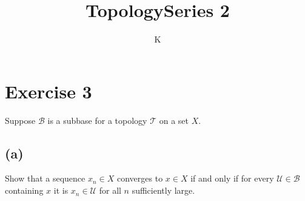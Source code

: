 \documentclass[a4paper]{article}
\title{Topology}
\author{K}
\title{Series 2}
\theoremstyle{definition}
\begin{document}
\maketitle

\section*{Exercise 3}
Suppose \(\mathcal{B}\) is a subbase for a topology \(\mathcal{T}\) on a set \(X\).

\subsection*{(a)}
Show that a sequence \(x_n \in X\) converges to \(x \in X\) if and only if for every \(\mathcal{U} \in \mathcal{B}\) containing \(x\) it is \(x_n \in \mathcal{U}\) for all \(n\) sufficiently large.
\end{document}

